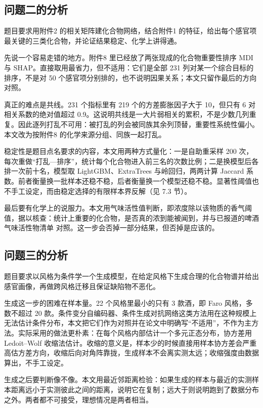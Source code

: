 \subsection{问题二的分析}

题目要求用附件2 的相关矩阵建化合物网络，结合附件1 的特征，给出每个感官项最关键的三类化合物，并论证结果稳定、化学上讲得通。

先说一个容易走错的地方。附件8 里已经放了两张现成的化合物重要性排序 MDI 与 SHAP。直接取用最省力，但不适用：它们是全部 231 列对某一个综合目标的排序，不是对 50 个感官项分别排的，也不说明因果关系\cite{lundberg2017}；本文只留作最后的方向对照。

真正的难点是共线。231 个指标里有 219 个的方差膨胀因子大于 10，但只有 6 对相关系数的绝对值超过 0.9。这说明共线是一大片弱相关的累积，不是少数几列重复。因此逐列打乱不可用：被打乱的列会被同族其余列顶替，重要性系统性偏小\cite{strobl2008}。本文改为按附件8 的化学来源分组、同族一起打乱。

稳定性是题目点名要求的内容，本文用两种方式量化：一是自助重采样 200 次，每次重做“打乱—排序”，统计每个化合物进入前三名的次数比例；二是换模型后各排一次前十名，模型取 LightGBM、ExtraTrees 与岭回归，两两计算 Jaccard 系数。前者衡量换一批样本还稳不稳，后者衡量换一个模型还稳不稳。显著性阈值也不手工设定，而由稳定选择的有限样本界反解（见 7.3 节）\cite{meinshausen2010}。

最后要有化学上的说服力。本文用气味活性值\cite{grosch1994}判断，即浓度除以该物质的香气阈值，据以核查：统计上重要的化合物，是否真的浓到能被闻到，并与已报道的啤酒气味活性物清单\cite{kishimoto2018} 对照。这一步会否掉一部分结果，但否掉是应该的。

\subsection{问题三的分析}

题目要求以风格为条件学一个生成模型，在给定风格下生成合理的化合物谱并给出感官画像，再做跨风格迁移且保证缺陷物不恶化。

生成这一步的困难在样本量。22 个风格里最小的只有 3 款酒，即 Faro 风格，多数不超过 20 款。条件变分自编码器、条件生成对抗网络这类方法用在这种规模上无法估计条件分布\cite{xu2019}，本文把它们作为对照并在论文中明确写“不适用”，不作为主方法。实际采用的做法更朴素：在每个风格内部估计一个多元正态分布，协方差用 Ledoit--Wolf 收缩法\cite{ledoit2004}估计。收缩的意义是，样本少的时候直接用样本协方差会严重高估方差方向，收缩后向对角阵靠拢，生成样本不会离实测太远；收缩强度由数据算出，不手工设定。

生成之后要判断像不像。本文用最近邻距离检验：如果生成的样本与最近的实测样本距离远小于实测彼此之间的距离，说明它在复制；远大于则说明跑到了数据分布之外。两者都不可接受，理想情况是两者相当。


